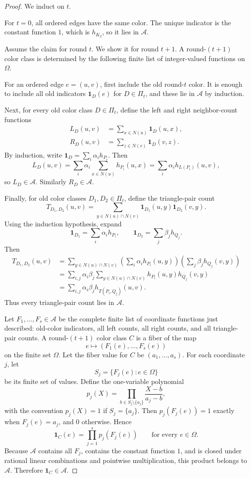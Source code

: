 \documentclass[11pt]{article}
\newcommand{\cA}{\mathcal{A}}
\begin{document}
\begin{proof}
We induct on $t$.

For $t=0$, all ordered edges have the same color.  The unique indicator is the constant function $1$, which is $h_{K_2}$, so it lies in $\cA$.

Assume the claim for round $t$.  We show it for round $t+1$.  A round-$(t+1)$ color class is determined by the following finite list of integer-valued functions on $\Omega$.

For an ordered edge $e=(u,v)$, first include the old round-$t$ color.  It is enough to include all old indicators $\mathbf{1}_D(e)$ for $D\in\Pi_t$, and these lie in $\cA$ by induction.

Next, for every old color class $D\in\Pi_t$, define the left and right neighbor-count functions
\begin{align*}
L_D(u,v)&=\sum_{x\in N(u)}\mathbf{1}_D(u,x),\\
R_D(u,v)&=\sum_{z\in N(v)}\mathbf{1}_D(v,z).
\end{align*}
By induction, write $\mathbf{1}_D=\sum_i\alpha_i h_{P_i}$.  Then
\[
L_D(u,v)=\sum_i\alpha_i\sum_{x\in N(u)}h_{P_i}(u,x)
=\sum_i\alpha_i h_{L(P_i)}(u,v),
\]
so $L_D\in\cA$.  Similarly $R_D\in\cA$.

Finally, for old color classes $D_1,D_2\in\Pi_t$, define the triangle-pair count
\[
T_{D_1,D_2}(u,v)
=\sum_{y\in N(u)\cap N(v)}\mathbf{1}_{D_1}(u,y)\mathbf{1}_{D_2}(v,y).
\]
Using the induction hypothesis, expand
\[
\mathbf{1}_{D_1}=\sum_i\alpha_i h_{P_i},
\qquad
\mathbf{1}_{D_2}=\sum_j\beta_j h_{Q_j}.
\]
Then
\begin{align*}
T_{D_1,D_2}(u,v)
&=\sum_{y\in N(u)\cap N(v)}
\left(\sum_i\alpha_i h_{P_i}(u,y)\right)
\left(\sum_j\beta_j h_{Q_j}(v,y)\right)\\
&=\sum_{i,j}\alpha_i\beta_j
\sum_{y\in N(u)\cap N(v)} h_{P_i}(u,y)h_{Q_j}(v,y)\\
&=\sum_{i,j}\alpha_i\beta_j h_{T(P_i,Q_j)}(u,v).
\end{align*}
Thus every triangle-pair count lies in $\cA$.

Let $F_1,\ldots,F_s\in\cA$ be the complete finite list of coordinate functions just described: old-color indicators, all left counts, all right counts, and all triangle-pair counts.  A round-$(t+1)$ color class $C$ is a fiber of the map
\[
e\longmapsto (F_1(e),\ldots,F_s(e))
\]
on the finite set $\Omega$.  Let the fiber value for $C$ be $(a_1,\ldots,a_s)$.  For each coordinate $j$, let
\[
S_j=\{F_j(e):e\in\Omega\}
\]
be its finite set of values.  Define the one-variable polynomial
\[
p_j(X)=\prod_{b\in S_j\setminus\{a_j\}}\frac{X-b}{a_j-b},
\]
with the convention $p_j(X)=1$ if $S_j=\{a_j\}$.  Then $p_j(F_j(e))=1$ exactly when $F_j(e)=a_j$, and $0$ otherwise.  Hence
\[
\mathbf{1}_C(e)=\prod_{j=1}^s p_j(F_j(e))
\qquad\text{for every }e\in\Omega.
\]
Because $\cA$ contains all $F_j$, contains the constant function $1$, and is closed under rational linear combinations and pointwise multiplication, this product belongs to $\cA$.  Therefore $\mathbf{1}_C\in\cA$.
\end{proof}
\end{document}
